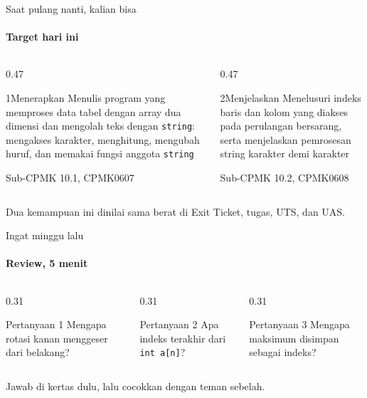 \documentclass[t]{beamer}
\begin{document}
\begin{frame}{Saat pulang nanti, kalian bisa}
\framesubtitle{Target hari ini}
\begin{columns}[T]
\begin{column}{0.47\textwidth}
\begin{Langkah}{1}{Menerapkan}
Menulis program yang memproses data tabel dengan array dua dimensi dan mengolah teks dengan \texttt{string}: mengakses karakter, menghitung, mengubah huruf, dan memakai fungsi anggota \texttt{string}

{\footnotesize\color{ITERAInkMuted}Sub-CPMK 10.1, CPMK0607}
\end{Langkah}
\end{column}
\begin{column}{0.47\textwidth}
\begin{Langkah}{2}{Menjelaskan}
Menelusuri indeks baris dan kolom yang diakses pada perulangan bersarang, serta menjelaskan pemrosesan string karakter demi karakter

{\footnotesize\color{ITERAInkMuted}Sub-CPMK 10.2, CPMK0608}
\end{Langkah}
\end{column}
\end{columns}
\vspace{8pt}
\begin{Catatan}
Dua kemampuan ini dinilai sama berat di Exit Ticket, tugas, UTS, dan UAS.
\end{Catatan}
\end{frame}

\begin{frame}{Ingat minggu lalu}
\framesubtitle{Review, 5 menit}
\begin{columns}[T]
\begin{column}{0.31\textwidth}
\begin{BlokGelap}{Pertanyaan 1}
Mengapa rotasi kanan menggeser dari belakang?
\end{BlokGelap}
\end{column}
\begin{column}{0.31\textwidth}
\begin{BlokGelap}{Pertanyaan 2}
Apa indeks terakhir dari \texttt{int a[n]}?
\end{BlokGelap}
\end{column}
\begin{column}{0.31\textwidth}
\begin{BlokGelap}{Pertanyaan 3}
Mengapa maksimum disimpan sebagai indeks?
\end{BlokGelap}
\end{column}
\end{columns}
\vspace{8pt}
Jawab di kertas dulu, lalu cocokkan dengan teman sebelah.
\end{frame}
\end{document}
